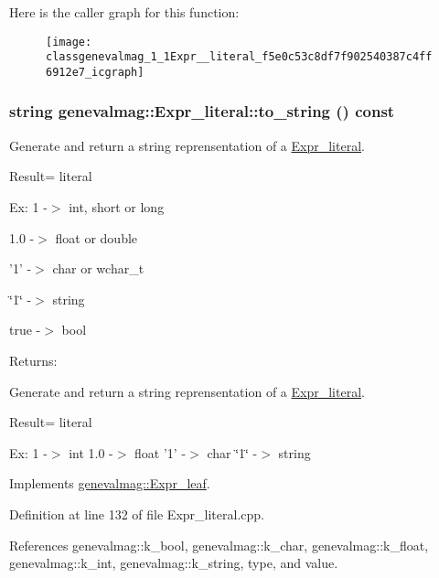 Here is the caller graph for this function:\nopagebreak
\begin{figure}[H]
\begin{center}
\leavevmode
\texttt{[image: classgenevalmag\_1\_1Expr\_\_literal\_f5e0c53c8df7f902540387c4ff6912e7\_icgraph]}
\end{center}
\end{figure}
\hypertarget{classgenevalmag_1_1Expr__literal_2e023f432f0a46b75f65cb0e36ac6583}{
\subsubsection[{to\_\-string}]{\setlength{\rightskip}{0pt plus 5cm}string genevalmag::Expr\_\-literal::to\_\-string () const}}
\label{classgenevalmag_1_1Expr__literal_2e023f432f0a46b75f65cb0e36ac6583}


Generate and return a string reprensentation of a \hyperlink{classgenevalmag_1_1Expr__literal}{Expr\_\-literal}.\par
 \par
 Result= literal\par
 \par
 Ex: 1 -$>$ int, short or long\par
 1.0 -$>$ float or double\par
 '1' -$>$ char or wchar\_\-t\par
 \char`\"{}1\char`\"{} -$>$ string\par
 true -$>$ bool\par
 \begin{Desc}
\item[Returns:]\end{Desc}
Generate and return a string reprensentation of a \hyperlink{classgenevalmag_1_1Expr__literal}{Expr\_\-literal}.

Result= literal

Ex: 1 -$>$ int 1.0 -$>$ float '1' -$>$ char \char`\"{}1\char`\"{} -$>$ string 

Implements \hyperlink{classgenevalmag_1_1Expr__leaf_96854f59a155b173b6e79007d87bdad5}{genevalmag::Expr\_\-leaf}.

Definition at line 132 of file Expr\_\-literal.cpp.

References genevalmag::k\_\-bool, genevalmag::k\_\-char, genevalmag::k\_\-float, genevalmag::k\_\-int, genevalmag::k\_\-string, type, and value.

